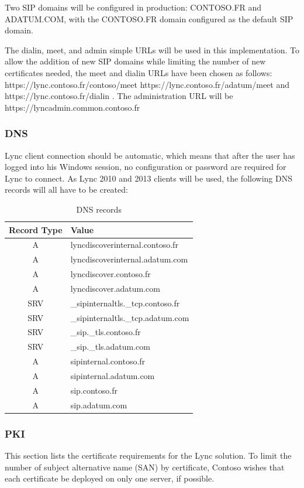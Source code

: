 	Two SIP domains will be configured in production: CONTOSO.FR and ADATUM.COM, with the CONTOSO.FR domain configured as the default SIP domain.
	
	The dialin, meet, and admin simple URLs will be used in this implementation. To allow the addition of new SIP domains while limiting the number of new certificates needed, the meet and dialin URLs have been chosen as follows: https://lync.contoso.fr/contoso/meet https://lync.contoso.fr/adatum/meet and \linebreak https://lync.contoso.fr/dialin .
	The administration URL will be \linebreak https://lyncadmin.common.contoso.fr
	
	
	\subsubsection{DNS}
	Lync client connection should be automatic, which means that after the user has logged into his Windows session, no configuration or password are required for Lync to connect. As Lync 2010 and 2013 clients will be used, the following DNS records will all have to be created:
	\begin{table}[H]
	\centering
	\begin{tabular}{c|l}
		Record Type & Value \\ \hline 
		A & lyncdiscoverinternal.contoso.fr \\
		A & lyncdiscoverinternal.adatum.com \\
		A & lyncdiscover.contoso.fr \\
		A & lyncdiscover.adatum.com \\
		SRV & \_sipinternaltls.\_tcp.contoso.fr \\
		SRV & \_sipinternaltls.\_tcp.adatum.com \\
		SRV & \_sip.\_tls.contoso.fr \\
		SRV & \_sip.\_tls.adatum.com \\
		A & sipinternal.contoso.fr \\
		A & sipinternal.adatum.com \\
		A & sip.contoso.fr \\ 
		A & sip.adatum.com
	\end{tabular}
	\caption{\label{tab:case_dns} DNS records}
	\end{table}

	
	\subsubsection{PKI}
	This section lists the certificate requirements for the Lync solution. To limit the number of subject alternative name (SAN) by certificate, Contoso wishes that each certificate be deployed on only one server, if possible.
	
